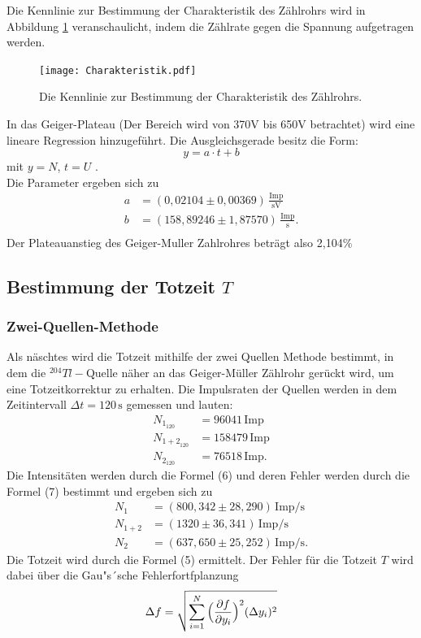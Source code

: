 \noindent
 Die Kennlinie zur Bestimmung der Charakteristik des Zählrohrs wird in Abbildung \ref{fig:Charakteristik} veranschaulicht, indem die Zählrate gegen die Spannung aufgetragen werden.

 \begin{figure}[H]
  \centering
  \texttt{[image: Charakteristik.pdf]}
  \caption{Die Kennlinie zur Bestimmung der Charakteristik des Zählrohrs.}
  \label{fig:Charakteristik}
\end{figure}
\noindent
In das Geiger-Plateau (Der Bereich wird von 370V bis 650V betrachtet) wird eine lineare Regression hinzugeführt.
Die Ausgleichsgerade besitz die Form:
\begin{equation}
 y=a\cdot t+b 
\end{equation}
mit \(y=N\), \(t=U\) .\\
Die Parameter ergeben sich zu
\begin{align*}
  a &=(0,02104 \pm 0,00369)\,\mathrm{\frac{Imp}{sV}} \\
  b &=(158,89246 \pm 1,87570)\,\mathrm{\frac{Imp}{s}} .\\
 \end{align*}
 \noindent
Der Plateauanstieg des Geiger-Muller Zahlrohres beträgt also 2,104\% 


\subsection{Bestimmung der Totzeit $T$}
\subsubsection{Zwei-Quellen-Methode}
  Als näschtes wird die Totzeit  mithilfe der zwei Quellen Methode bestimmt, in dem die $^{204} Tl-\text{Quelle}$ näher an das Geiger-Müller Zählrohr gerückt wird, um eine Totzeitkorrektur zu erhalten.
  Die Impulsraten der Quellen werden in dem Zeitintervall  $\Delta t=120 \, \text{s}$ gemessen und lauten:
  \begin{align*}
    N_{1_{120}} &=96041\, \text{Imp}\\
    N_{{1+2}_{120}} &=158479\, \text{Imp}\\
    N_{2_{120}} &=76518\, \text{Imp}.
   \end{align*} 
  Die Intensitäten werden durch die Formel (6) und deren Fehler werden durch die Formel (7) bestimmt und ergeben sich zu
  \begin{align*}
    N_1 &=(800,342\pm 28,290)\,\mathrm{Imp/s} \\
    N_{1+2} &=(1320\pm 36,341)\,\mathrm{Imp/s} \\
    N_2 &=(637,650\pm 25,252)\,\mathrm{Imp/s}.
  \end{align*} 
  Die Totzeit wird durch die Formel (5) ermittelt.
  Der Fehler für die Totzeit $T$  wird dabei über die Gau"s´sche Fehlerfortfplanzung 
  \begin{equation}
      \Delta f = \sqrt{\sum_{i=1}^N {\Bigl(\frac{\partial f}{\partial y_i}\Bigr)^2 (\Delta y_i)^2}}
  \end{equation}
 
